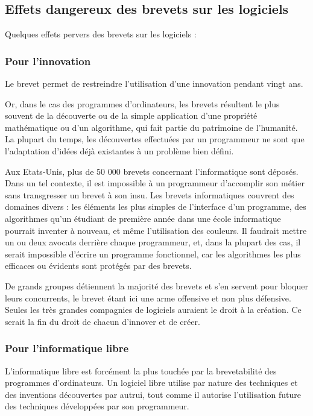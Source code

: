 \documentclass{article}
\begin{document}
\subsection{Effets dangereux des brevets sur les logiciels}

Quelques effets pervers des brevets sur les logiciels :
\subsubsection{Pour l'innovation}

Le brevet permet de restreindre l'utilisation d'une innovation pendant vingt ans.

Or, dans le cas des programmes d'ordinateurs, les brevets résultent le plus souvent de la découverte ou de la simple application d'une propriété mathématique ou d'un algorithme, qui fait partie du patrimoine de l'humanité. La plupart du temps, les découvertes effectuées par un programmeur ne sont que l'adaptation d'idées déjà existantes à un problème bien défini.

Aux Etats-Unis, plus de 50 000 brevets concernant l'informatique sont déposés. Dans un tel contexte, il est impossible à un programmeur d'accomplir son métier sans transgresser un brevet à son insu. Les brevets informatiques couvrent des domaines divers : les éléments les plus simples de l'interface d'un programme, des algorithmes qu'un étudiant de première année dans une école informatique pourrait inventer à nouveau, et même l'utilisation des couleurs. Il faudrait mettre un ou deux avocats derrière chaque programmeur, et, dans la plupart des cas, il serait impossible d'écrire un programme fonctionnel, car les algorithmes les plus efficaces ou évidents sont protégés par des brevets.

De grands groupes détiennent la majorité des brevets et s'en servent pour bloquer leurs concurrents, le brevet étant ici une arme offensive et non plus défensive. Seules les très grandes compagnies de logiciels auraient le droit à la création. Ce serait la fin du droit de chacun d'innover et de créer.
\subsubsection{Pour l'informatique libre}

L'informatique libre est forcément la plus touchée par la brevetabilité des programmes d'ordinateurs. Un logiciel libre utilise par nature des techniques et des inventions découvertes par autrui, tout comme il autorise l'utilisation future des techniques développées par son programmeur.
\end{document}
